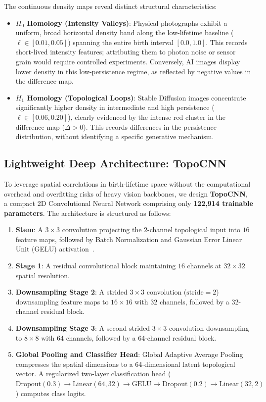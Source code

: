 \documentclass[11pt,a4paper]{article}
\begin{document}
The continuous density maps reveal distinct structural characteristics:
\begin{itemize}
    \item \textbf{$H_0$ Homology (Intensity Valleys)}: Physical photographs exhibit a uniform, broad horizontal density band along the low-lifetime baseline ($\ell \in [0.01, 0.05]$) spanning the entire birth interval $[0.0, 1.0]$. This records short-lived intensity features; attributing them to photon noise or sensor grain would require controlled experiments. Conversely, AI images display lower density in this low-persistence regime, as reflected by negative values in the difference map.
    \item \textbf{$H_1$ Homology (Topological Loops)}: Stable Diffusion images concentrate significantly higher density in intermediate and high persistence ($\ell \in [0.06, 0.20]$), clearly evidenced by the intense red cluster in the difference map ($\Delta > 0$). This records differences in the persistence distribution, without identifying a specific generative mechanism.
\end{itemize}

\subsection{Lightweight Deep Architecture: TopoCNN}
To leverage spatial correlations in birth-lifetime space without the computational overhead and overfitting risks of heavy vision backbones, we design \textbf{TopoCNN}, a compact 2D Convolutional Neural Network comprising only \textbf{122,914 trainable parameters}. The architecture is structured as follows:
\begin{enumerate}
    \item \textbf{Stem}: A $3 \times 3$ convolution projecting the $2$-channel topological input into $16$ feature maps, followed by Batch Normalization and Gaussian Error Linear Unit (GELU) activation~\cite{hendrycks2016gaussian}.
    \item \textbf{Stage 1}: A residual convolutional block maintaining $16$ channels at $32 \times 32$ spatial resolution.
    \item \textbf{Downsampling Stage 2}: A strided $3 \times 3$ convolution ($\text{stride}=2$) downsampling feature maps to $16 \times 16$ with $32$ channels, followed by a 32-channel residual block.
    \item \textbf{Downsampling Stage 3}: A second strided $3 \times 3$ convolution downsampling to $8 \times 8$ with $64$ channels, followed by a 64-channel residual block.
    \item \textbf{Global Pooling and Classifier Head}: Global Adaptive Average Pooling compresses the spatial dimensions to a 64-dimensional latent topological vector. A regularized two-layer classification head ($\text{Dropout}(0.3) \to \text{Linear}(64, 32) \to \text{GELU} \to \text{Dropout}(0.2) \to \text{Linear}(32, 2)$) computes class logits.
\end{enumerate}
\end{document}
